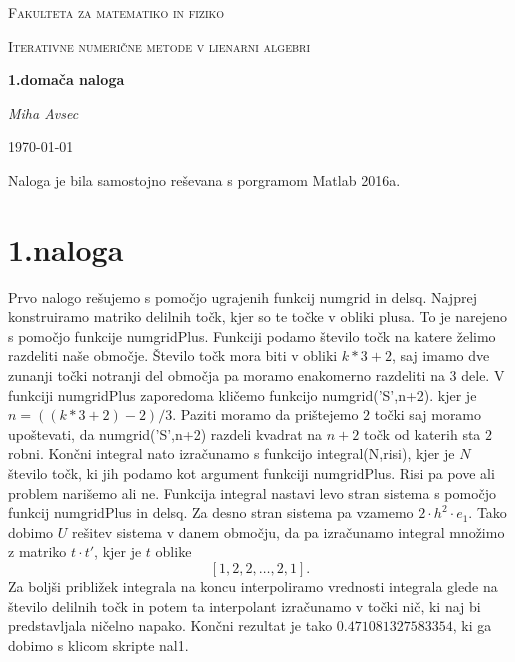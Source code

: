\documentclass[11pt]{article} %
\begin{document}
\begin{titlepage}
	\centering
	{\scshape\LARGE Fakulteta za matematiko in fiziko \par}
	\vspace{1cm}
	{\scshape\Large Iterativne numerične metode v lienarni algebri\par}
	\vspace{1.5cm}
	{\huge\bfseries 1.domača naloga\par}
	\vspace{2cm}
	{\Large\itshape Miha Avsec\par}
	\vfill

	\vfill

	{\large \today\par}
\end{titlepage}

Naloga je bila samostojno reševana s porgramom Matlab 2016a.

\section{1.naloga}

Prvo nalogo rešujemo s pomočjo ugrajenih funkcij numgrid in delsq. Najprej konstruiramo matriko delilnih točk, kjer so te točke v obliki plusa. To je narejeno s pomočjo funkcije numgridPlus.
Funkciji podamo število točk na katere želimo razdeliti naše območje. Število točk mora biti v obliki $k*3 +2$, saj imamo dve zunanji točki notranji del območja pa moramo enakomerno razdeliti na $3$ dele. V funkciji numgridPlus zaporedoma kličemo funkcijo numgrid('S',n+2). kjer je $n = ((k*3+2)-2)/3$. Paziti moramo da prištejemo $2$ točki saj moramo upoštevati, da numgrid('S',n+2) razdeli kvadrat na $n+2$ točk od katerih sta $2$ robni. Končni integral nato izračunamo s funkcijo integral(N,risi), kjer je $N$ število točk, ki jih podamo kot argument funkciji numgridPlus. Risi pa pove ali problem narišemo ali ne. Funkcija integral nastavi levo stran sistema s pomočjo funkcij numgridPlus in delsq. Za desno stran sistema pa vzamemo $2\cdot h^2 \cdot e_1$. Tako dobimo $U$ rešitev sistema v danem območju, da pa izračunamo integral množimo z matriko $t\cdot t'$, kjer je $t$ oblike
$$[1,2,2, \ldots, 2,1].$$
 Za boljši približek integrala na koncu interpoliramo vrednosti integrala glede na število delilnih točk in potem ta interpolant izračunamo v točki nič, ki naj bi predstavljala ničelno napako. Končni rezultat je tako $0.471081327583354$, ki ga dobimo s klicom skripte nal1.
\end{document}
